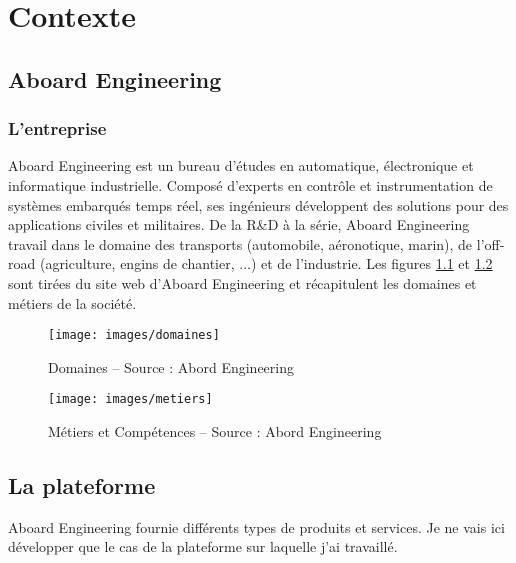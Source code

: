 \chapter{Contexte}
\section{Aboard Engineering}
\subsection{L'entreprise}
Aboard Engineering est un bureau d'études en automatique, électronique et informatique industrielle. Composé d'experts en contrôle et instrumentation de systèmes embarqués temps réel, ses ingénieurs développent des solutions pour des applications civiles et militaires. De la R\&D à la série, Aboard Engineering travail dans le domaine des transports (automobile, aéronotique, marin), de l'off-road (agriculture, engins de chantier, ...) et de l'industrie. Les figures \ref{fig:domaines} et  \ref{fig:metiers} sont tirées du site web d'Aboard Engineering et récapitulent les domaines et métiers de la société.

\begin{figure}[h]
	\center
	\texttt{[image: images/domaines]}
	\caption{Domaines -- Source : Abord Engineering}
	\label{fig:domaines}
\end{figure}

\begin{figure}[h]
	\center
	\texttt{[image: images/metiers]}
	\caption{Métiers et Compétences -- Source : Abord Engineering}
	\label{fig:metiers}
\end{figure}

\section{La plateforme }
\label{sec:orianne}

Aboard Engineering fournie différents types de produits et services. Je ne vais ici développer que le cas de la plateforme  sur laquelle j'ai travaillé.

